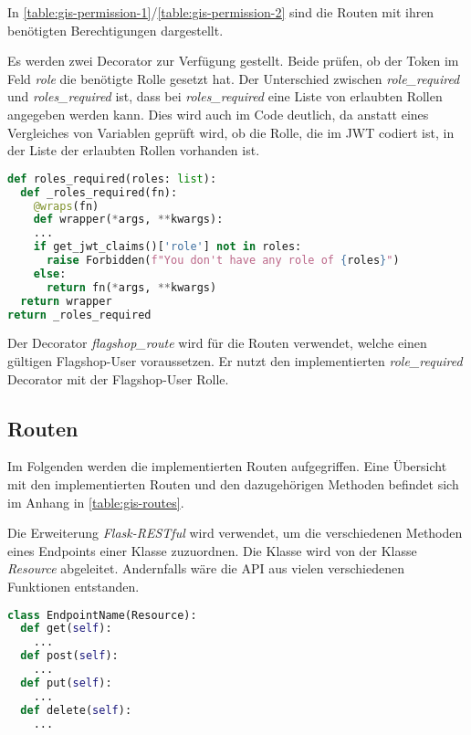 In \autoref{table:gis-permission-1}/\ref{table:gis-permission-2} sind die Routen mit ihren benötigten Berechtigungen dargestellt.

Es werden zwei Decorator zur Verfügung gestellt. Beide prüfen, ob der Token im Feld \textit{role} die benötigte Rolle gesetzt hat. Der Unterschied zwischen \textit{role\_required} und \textit{roles\_required} ist, dass bei \textit{roles\_required} eine Liste von erlaubten Rollen angegeben werden kann. Dies wird auch im Code deutlich, da anstatt eines Vergleiches von Variablen geprüft wird, ob die Rolle, die im JWT codiert ist, in der Liste der erlaubten Rollen vorhanden ist.

\begin{lstlisting}[language=Python, frame=single, caption={GIS Prüfung der Rollen}, captionpos=b, label={lst:gis-permission-wrapper}]
def roles_required(roles: list):
  def _roles_required(fn):
    @wraps(fn)
    def wrapper(*args, **kwargs):
    ...
    if get_jwt_claims()['role'] not in roles:
      raise Forbidden(f"You don't have any role of {roles}")
    else:
      return fn(*args, **kwargs)
  return wrapper
return _roles_required
\end{lstlisting}

Der Decorator \textit{flagshop\_route} wird für die Routen verwendet, welche einen gültigen Flagshop-User voraussetzen. Er nutzt den implementierten \textit{role\_required} Decorator mit der Flagshop-User Rolle.

\subsection{Routen} \label{sub:realisierung-gis-routen}
Im Folgenden werden die implementierten Routen aufgegriffen. Eine Übersicht mit den implementierten Routen und den dazugehörigen Methoden befindet sich im Anhang in \autoref{table:gis-routes}.

Die Erweiterung \textit{Flask-RESTful} wird verwendet, um die verschiedenen Methoden eines Endpoints einer Klasse zuzuordnen. Die Klasse wird von der Klasse \textit{Resource} abgeleitet. Andernfalls wäre die API aus vielen verschiedenen Funktionen entstanden.

\begin{lstlisting}[language=Python, frame=single, caption={GIS Beispiel eines Endpoints}, captionpos=b, label={lst:gis-endpoint}]
class EndpointName(Resource):
  def get(self):
    ...
  def post(self):
    ...
  def put(self):
    ...
  def delete(self):
    ...
\end{lstlisting}


